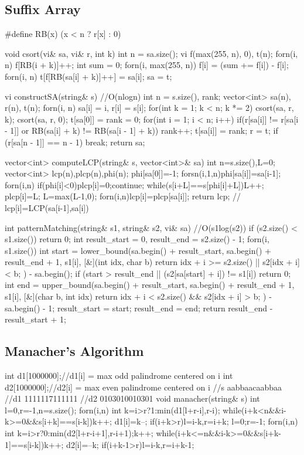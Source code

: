 \documentclass[10pt, landscape, twocolumn, a4paper, notitlepage]{article}
\begin{document}
\subsection{Suffix Array}
\begin{code}
#define RB(x) (x < n ? r[x] : 0)
 
void csort(vi& sa, vi& r, int k) {
    int n = sa.size();
    vi f(max(255, n), 0), t(n);
    forn(i, n) f[RB(i + k)]++;
    int sum  = 0;
    forn(i, max(255, n)) f[i] = (sum += f[i]) - f[i];
    forn(i, n) t[f[RB(sa[i] + k)]++] = sa[i];
    sa = t;
}
 
vi constructSA(string& s) { //O(nlogn)
    int n = s.size(), rank;
    vector<int> sa(n), r(n), t(n);
    forn(i, n) sa[i] = i, r[i] = s[i];
    for(int k = 1; k < n; k *= 2) {
        csort(sa, r, k); csort(sa, r, 0);
        t[sa[0]] = rank = 0;
        for(int i = 1; i < n; i++) {
            if(r[sa[i]] != r[sa[i - 1]] or RB(sa[i] + k) != RB(sa[i - 1] + k)) rank++;
            t[sa[i]] = rank;
        }
        r = t;
        if (r[sa[n - 1]] == n - 1) break;
    }
    return sa;
}

vector<int> computeLCP(string& s, vector<int>& sa){
	int n=s.size(),L=0;
	vector<int> lcp(n),plcp(n),phi(n);
	phi[sa[0]]=-1;
	forsn(i,1,n)phi[sa[i]]=sa[i-1];
	forn(i,n){
		if(phi[i]<0){plcp[i]=0;continue;}
		while(s[i+L]==s[phi[i]+L])L++;
		plcp[i]=L;
		L=max(L-1,0);
	}
	forn(i,n)lcp[i]=plcp[sa[i]];
	return lcp; // lcp[i]=LCP(sa[i-1],sa[i])
}
 
int patternMatching(string& s1, string& s2, vi& sa) { //O(s1log(s2))
    if (s2.size() < s1.size()) {
        return 0;
    }
    int result_start = 0, result_end = s2.size() - 1;
    forn(i, s1.size()) {
        int start = lower_bound(sa.begin() + result_start, sa.begin() + result_end + 1, s1[i], [&](int idx, char b) {
            return idx + i >= s2.size() || s2[idx + i] < b;
        }) - sa.begin();
        if (start > result_end || (s2[sa[start] + i]) != s1[i]) {
            return 0;
        }
        int end = upper_bound(sa.begin() + result_start, sa.begin() + result_end + 1, s1[i], [&](char b, int idx) {
            return idx + i < s2.size() && s2[idx + i] > b;
        }) - sa.begin() - 1;
        result_start = start;
        result_end = end;
    }
    return result_end - result_start + 1;
}
\end{code}
\subsection{Manacher's Algorithm}
\begin{code}
int d1[1000000];//d1[i] = max odd palindrome centered on i
int d2[1000000];//d2[i] = max even palindrome centered on i
//s  aabbaacaabbaa
//d1 1111117111111
//d2 0103010010301
void manacher(string& s){
    int l=0,r=-1,n=s.size();
    forn(i,n){
        int k=i>r?1:min(d1[l+r-i],r-i);
        while(i+k<n&&i-k>=0&&s[i+k]==s[i-k])k++;
        d1[i]=k--;
        if(i+k>r)l=i-k,r=i+k;
    }
    l=0;r=-1;
    forn(i,n){
        int k=i>r?0:min(d2[l+r-i+1],r-i+1);k++;
        while(i+k<=n&&i-k>=0&&s[i+k-1]==s[i-k])k++;
        d2[i]=--k;
        if(i+k-1>r)l=i-k,r=i+k-1;
    }
}
\end{code}
\end{document}

